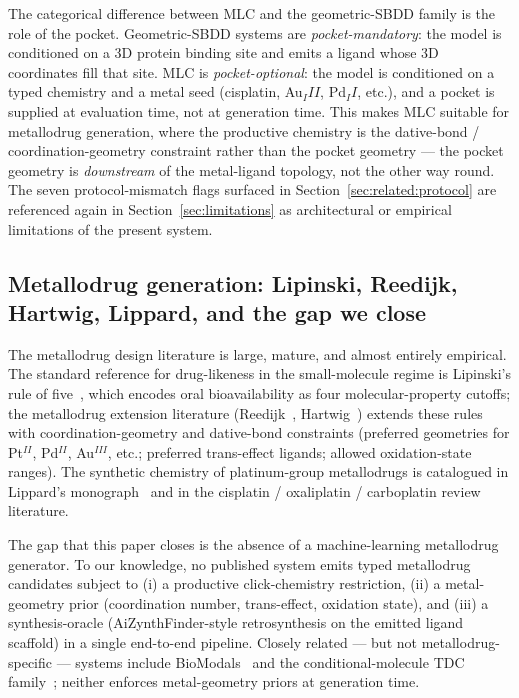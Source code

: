 The categorical difference between MLC and the geometric-SBDD
family is the role of the pocket. Geometric-SBDD systems are
\emph{pocket-mandatory}: the model is conditioned on a 3D protein
binding site and emits a ligand whose 3D coordinates fill that site.
MLC is \emph{pocket-optional}: the model is conditioned on a typed
chemistry and a metal seed (cisplatin, Au$_III$, Pd$_II$, etc.),
and a pocket is supplied at evaluation time, not at generation time.
This makes MLC suitable for metallodrug generation, where the
productive chemistry is the dative-bond / coordination-geometry
constraint rather than the pocket geometry --- the pocket geometry is
\emph{downstream} of the metal-ligand topology, not the other way
round. The seven protocol-mismatch flags surfaced in
Section~\ref{sec:related:protocol} are referenced again in
Section~\ref{sec:limitations} as architectural or empirical
limitations of the present system.

\subsection{Metallodrug generation: Lipinski, Reedijk, Hartwig, Lippard, and the gap we close}
\label{sec:related:metallodrug}

The metallodrug design literature is large, mature, and almost
entirely empirical. The standard reference for drug-likeness in the
small-molecule regime is Lipinski's rule of five~\cite{footnote:lipinski2001},
which encodes oral bioavailability as four molecular-property
cutoffs; the metallodrug extension literature
(Reedijk~\cite{footnote:reedijk1996}, Hartwig~\cite{footnote:hartwig2010})
extends these rules with coordination-geometry and dative-bond
constraints (preferred geometries for Pt$^{II}$, Pd$^{II}$,
Au$^{III}$, etc.; preferred trans-effect ligands; allowed
oxidation-state ranges). The synthetic chemistry of
platinum-group metallodrugs is catalogued in Lippard's
monograph~\cite{footnote:lippard1999} and in the cisplatin /
oxaliplatin / carboplatin review literature.

The gap that this paper closes is the absence of a machine-learning
metallodrug generator. To our knowledge, no published system
emits typed metallodrug candidates subject to (i) a productive
click-chemistry restriction, (ii) a metal-geometry prior
(coordination number, trans-effect, oxidation state), and (iii) a
synthesis-oracle (AiZynthFinder-style retrosynthesis on the
emitted ligand scaffold) in a single end-to-end pipeline.
Closely related --- but not metallodrug-specific --- systems include
BioModals~\cite{footnote:biomodals} and the conditional-molecule
TDC family~\cite{footnote:tdc}; neither enforces metal-geometry
priors at generation time.

